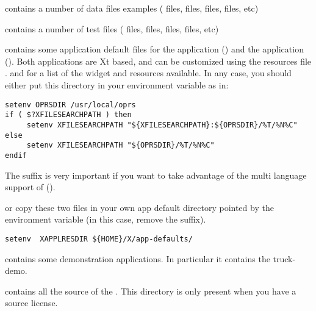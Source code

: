 \begin{description}
\begin{description}
\end{description}

\item [\file{data}] contains a number of data files examples (
files,  files,  files,  files, etc)

\item [\file{data/test}] contains a number of test files (
files,  files,  files,  files, etc)

\item [\file{app-defaults}] contains some application default files for the
\XPK{} application () and the \OPE{} application
(). Both applications are Xt based, and can be customized
using the resources file \cite{Xt-manual,Xlib-manual,Motif-manual}.  and  for a list of the widget and resources available.
In any case, you should either put this directory in your
 environment variable as in:

\begin{verbatim}
setenv OPRSDIR /usr/local/oprs
if ( $?XFILESEARCHPATH ) then
     setenv XFILESEARCHPATH "${XFILESEARCHPATH}:${OPRSDIR}/%T/%N%C"
else
     setenv XFILESEARCHPATH "${OPRSDIR}/%T/%N%C"
endif
\end{verbatim}

The  suffix is very important if you want to take advantage of the
multi language support of \COPRS{} ().

or copy these two files in your own app default directory pointed by the
environment variable  (in this case, remove the 
suffix).

\begin{verbatim}
setenv  XAPPLRESDIR ${HOME}/X/app-defaults/
\end{verbatim}

\item [\file{demo}] contains some demonstration applications. In
particular it contains the truck-demo.

\item [\file{src}] contains all the source of the \COPRSDE{}. This directory is
only present when you have a source license.

\end{description}

